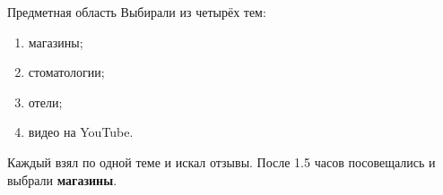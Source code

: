 \documentclass[mathserif,utf8,14pt]{beamer}
\begin{document}
\begin{frame}{Предметная область}
    Выбирали из четырёх тем:
    \begin{enumerate}
        \item магазины;
        \item стоматологии;
        \item отели;
        \item видео на YouTube.
    \end{enumerate}
    Каждый взял по одной теме и искал отзывы. После 1.5 часов посовещались
    и выбрали \textbf{магазины}.
\end{frame}

\end{document}
